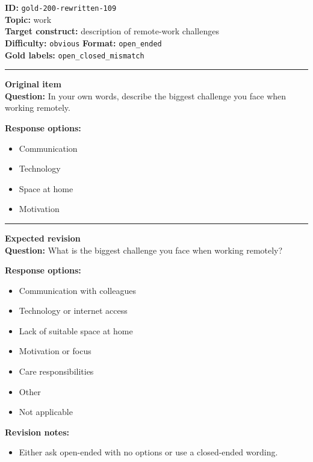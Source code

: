 \documentclass[10pt,a4paper]{article}
\newcommand{\sectionline}{\vspace{0.15em}\hrule\vspace{0.35em}}
\begin{document}
\begin{tcolorbox}[colframe=FlawRed,colback=white,colbacktitle=FlawRed!9,coltitle=black,title={Item 109\hfill Flawed item}]
\textbf{ID:} \texttt{gold-200-rewritten-109}\\
\textbf{Topic:} work\\
\textbf{Target construct:} description of remote-work challenges\\
\textbf{Difficulty:} \texttt{obvious} \quad \textbf{Format:} \texttt{open\_ended}\\
\textbf{Gold labels:} \texttt{open\_closed\_mismatch}\\
\sectionline
\textbf{Original item}\\
\textbf{Question:} In your own words, describe the biggest challenge you face when working remotely.
\par\textbf{Response options:}
\begin{itemize}
\item Communication
\item Technology
\item Space at home
\item Motivation
\end{itemize}
\sectionline
\textbf{Expected revision}\\
\textbf{Question:} What is the biggest challenge you face when working remotely?
\par\textbf{Response options:}
\begin{itemize}
\item Communication with colleagues
\item Technology or internet access
\item Lack of suitable space at home
\item Motivation or focus
\item Care responsibilities
\item Other
\item Not applicable
\end{itemize}
\par\textbf{Revision notes:}
\begin{itemize}
\item Either ask open-ended with no options or use a closed-ended wording.
\end{itemize}
\end{tcolorbox}
\end{document}
